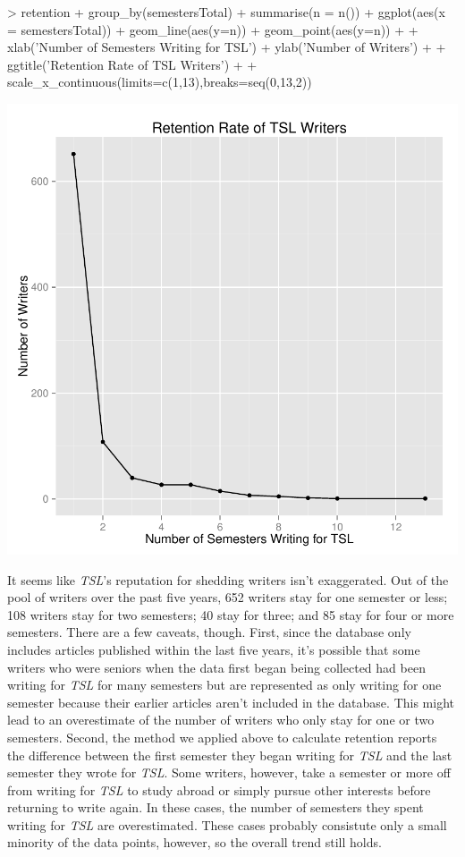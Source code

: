 \documentclass[a4paper]{article}
\begin{document}
\begin{Schunk}
\begin{Sinput}
> retention %
+   group_by(semestersTotal) %
+   summarise(n = n()) %
+   ggplot(aes(x = semestersTotal)) + geom_line(aes(y=n)) + geom_point(aes(y=n)) +
+   xlab('Number of Semesters Writing for TSL') + ylab('Number of Writers') +
+   ggtitle('Retention Rate of TSL Writers') +
+   scale_x_continuous(limits=c(1,13),breaks=seq(0,13,2))
\end{Sinput}
\end{Schunk}
\includegraphics{FinalProject-015}



It seems like \textit{TSL}'s reputation for shedding writers isn't exaggerated. Out of the pool of writers over the past five years, 652 writers stay for one semester or less; 108 writers stay for two semesters; 40 stay for three; and 85 stay for four or more semesters. There are a few caveats, though. First, since the database only includes articles published within the last five years, it's possible that some writers who were seniors when the data first began being collected had been writing for \textit{TSL} for many semesters but are represented as only writing for one semester because their earlier articles aren't included in the database. This might lead to an overestimate of the number of writers who only stay for one or two semesters. Second, the method we applied above to calculate retention reports the difference between the first semester they began writing for \textit{TSL} and the last semester they wrote for \textit{TSL}. Some writers, however, take a semester or more off from writing for \textit{TSL} to study abroad or simply pursue other interests before returning to write again. In these cases, the number of semesters they spent writing for \textit{TSL} are overestimated. These cases probably consistute only a small minority of the data points, however, so the overall trend still holds.
\end{document}
